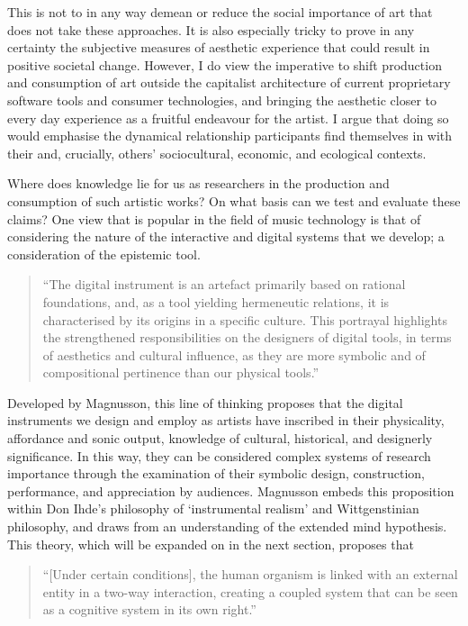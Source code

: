 This is not to in any way demean or reduce the social importance of art that does not take these approaches. It is also especially tricky to prove in any certainty the subjective measures of aesthetic experience that could result in positive societal change. However, I do view the imperative to shift production and consumption of art outside the capitalist architecture of current proprietary software tools and consumer technologies, and bringing the aesthetic closer to every day experience as a fruitful endeavour for the artist. I argue that doing so would emphasise the dynamical relationship participants find themselves in with their and, crucially, others’ sociocultural, economic, and ecological contexts.

Where does knowledge lie for us as researchers in the production and consumption of such artistic works? On what basis can we test and evaluate these claims? One view that is popular in the field of music technology is that of considering the nature of the interactive and digital systems that we develop; a consideration of the epistemic tool. 
\begin{quote}
    “The digital instrument is an artefact primarily based on rational foundations, and, as a tool yielding hermeneutic relations, it is characterised by its origins in a specific culture. This portrayal highlights the strengthened responsibilities on the designers of digital tools, in terms of aesthetics and cultural influence, as they are more symbolic and of compositional pertinence than our physical tools.” \citep[p. 335]{magnusson2009a} 
\end{quote}
Developed by Magnusson, this line of thinking proposes that the digital instruments we design and employ as artists have inscribed in their physicality, affordance and sonic output, knowledge of cultural, historical, and designerly significance. In this way, they can be considered complex systems of research importance through the examination of their symbolic design, construction, performance, and appreciation by audiences. Magnusson embeds this proposition within Don Ihde’s philosophy of ‘instrumental realism’ and Wittgenstinian philosophy, and draws from an understanding of the extended mind hypothesis. This theory, which will be expanded on in the next section, proposes that 
\begin{quote}
    “[Under certain conditions], the human organism is linked with an external entity in a two-way interaction, creating a coupled system that can be seen as a cognitive system in its own right.” \citep[p. 7]{clark1998}
\end{quote}
